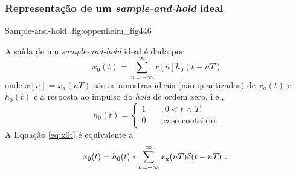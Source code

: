 \begin{frame}[allowframebreaks]
  \frametitle{Representação de um \textit{sample-and-hold} ideal}

  {Sample-and-hold \citep{oppenheim2009}.}{fig:oppenheim_fig446}

  A saída de um \textit{sample-and-hold} ideal é dada por
  \begin{equation}
  x_0(t) = \sum_{n=-\infty}^{\infty} x[n] h_0 (t -nT)
  \label{eq:x0t}
  \end{equation}
  onde $x[n] = x_a(nT)$ são as amostras ideais (não quantizadas) de $x_a(t)$ e 
  $h_0(t)$ é a resposta ao impulso do \textit{hold} de ordem zero, i.e.,
  \begin{equation}
  h_0(t) = \begin{cases} 1  \quad &,  0 < t < T ,\\ 
                         0 &, \mbox{caso contrário.}\end{cases} 
  \end{equation}
  A Equação \ref{eq:x0t} é equivalente a
  \begin{equation}
  x_0(t) = h_0(t) \ast \sum_{n=-\infty}^{\infty} x_a(nT) \delta(t-nT) \textmd{ . }
  \end{equation}
\end{frame}

